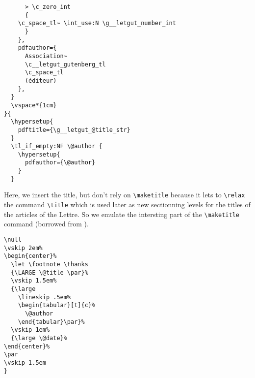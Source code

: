 \documentclass{letgut}
\begin{document}
\begin{lstlisting}
      > \c_zero_int
      {
	\c_space_tl~ \int_use:N \g__letgut_number_int
      }
    },
    pdfauthor={
      Association~
      \c__letgut_gutenberg_tl
      \c_space_tl
      (éditeur)
    },
  }
  \vspace*{1cm}
}{
  \hypersetup{
    pdftitle={\g__letgut_@title_str}
  }
  \tl_if_empty:NF \@author {
    \hypersetup{
      pdfauthor={\@author}
    }
  }
\end{lstlisting}
Here, we insert the title, but don't rely on \lstinline+\maketitle+ because it
lets to \lstinline+\relax+ the command \lstinline+\title+ which is used later as new sectionning
levels for the titles of the articles of the Lettre. So we emulate the
intersting part of the \lstinline+\maketitle+ command (borrowed from ).
\begin{lstlisting}
\null
\vskip 2em%
\begin{center}%
  \let \footnote \thanks
  {\LARGE \@title \par}%
  \vskip 1.5em%
  {\large
    \lineskip .5em%
    \begin{tabular}[t]{c}%
      \@author
    \end{tabular}\par}%
  \vskip 1em%
  {\large \@date}%
\end{center}%
\par
\vskip 1.5em
}
\end{lstlisting}
\end{document}
